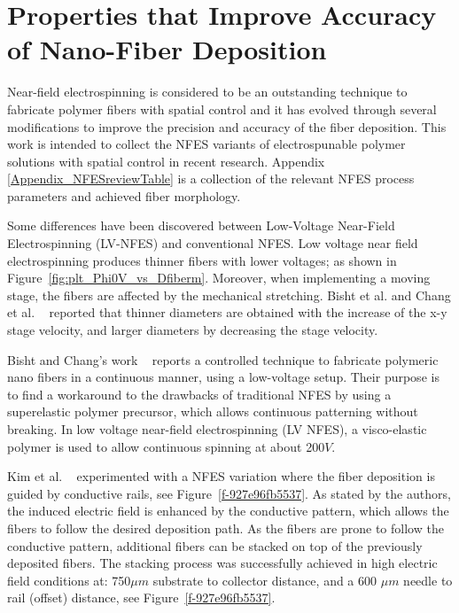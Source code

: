 \section{Properties that Improve Accuracy of Nano-Fiber Deposition}
Near-field electrospinning is considered to be an outstanding technique to fabricate polymer fibers with spatial control and it has evolved through several modifications to improve the precision and accuracy of the fiber deposition. This work is intended to collect the NFES variants of electrospunable polymer solutions with spatial control in recent research. Appendix \ref{Appendix_NFESreviewTable} is a collection of the relevant NFES process parameters and achieved fiber morphology.

Some differences have been discovered between Low-Voltage Near-Field Electrospinning (LV-NFES) and conventional NFES. Low voltage near field electrospinning produces thinner fibers with lower voltages; as shown in Figure~\ref{fig:plt_Phi0V_vs_Dfiberm}. Moreover, when implementing a moving stage, the fibers are affected by the mechanical stretching. Bisht et al. and Chang et al. \unskip~\cite{527120:11973130,527120:11974313} reported that thinner diameters are obtained with the increase of the x-y stage velocity, and larger diameters by decreasing the stage velocity.

Bisht and Chang's work \unskip~\cite{527120:11973130,527120:11974313} reports a controlled technique to fabricate polymeric nano fibers in a continuous manner, using a low-voltage setup. Their purpose is to find a workaround to the drawbacks of traditional NFES by using a superelastic polymer precursor, which allows continuous patterning without breaking. In low voltage near-field electrospinning (LV NFES), a visco-elastic polymer is used to allow continuous spinning at about 200$V $.

Kim et al. \unskip~\cite{527120:11974313} experimented with a NFES variation where the fiber deposition is guided by conductive rails, see Figure~\ref{f-927e96fb5537}. As stated by the authors, the induced electric field is enhanced by the conductive pattern, which allows the fibers to follow the desired deposition path. As the fibers are prone to follow the conductive pattern, additional fibers can be stacked on top of the previously deposited fibers. The stacking process was successfully achieved in high electric field conditions at: 750$\mu m $ substrate to collector distance, and a 600 $\mu m $ needle to rail (offset) distance, see Figure~\ref{f-927e96fb5537}.


